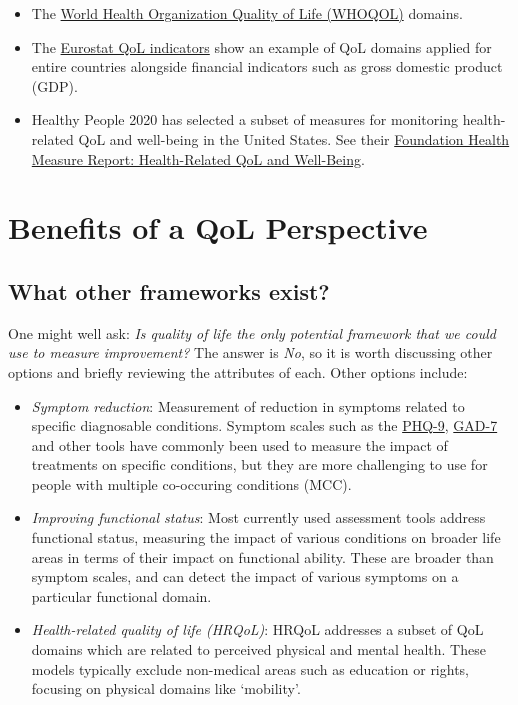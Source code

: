 \documentclass[
]{book}
\providecommand{\tightlist}{%
  \setlength{\itemsep}{0pt}\setlength{\parskip}{0pt}}
\begin{document}
\begin{itemize}
\tightlist
\item
  The \href{https://apps.who.int/iris/bitstream/handle/10665/77932/WHO_HIS_HSI_Rev.2012.03_eng.pdf?sequence=1\&isAllowed=y}{World Health Organization Quality of Life (WHOQOL)} domains.
\item
  The \href{https://ec.europa.eu/eurostat/statistics-explained/index.php?title=Quality_of_life_indicators}{Eurostat QoL indicators} show an example of QoL domains applied for entire countries alongside financial indicators such as gross domestic product (GDP).
\item
  Healthy People 2020 has selected a subset of measures for monitoring health-related QoL and well-being in the United States. See their \href{https://www.healthypeople.gov/sites/default/files/HRQoLWBFullReport.pdf}{Foundation Health Measure Report: Health-Related QoL and Well-Being}.
\end{itemize}

\hypertarget{benefits-of-a-qol-perspective}{%
\section{Benefits of a QoL Perspective}\label{benefits-of-a-qol-perspective}}

\hypertarget{what-other-frameworks-exist}{%
\subsection{What other frameworks exist?}\label{what-other-frameworks-exist}}

One might well ask: \emph{Is quality of life the only potential framework that we could use to measure improvement?} The answer is \emph{No}, so it is worth discussing other options and briefly reviewing the attributes of each. Other options include:

\begin{itemize}
\tightlist
\item
  \emph{Symptom reduction}: Measurement of reduction in symptoms related to specific diagnosable conditions. Symptom scales such as the \href{https://www.phqscreeners.com/sites/g/files/g10049256/f/201412/PHQ-9_English.pdf}{PHQ-9}, \href{}{GAD-7} and other tools have commonly been used to measure the impact of treatments on specific conditions, but they are more challenging to use for people with multiple co-occuring conditions (MCC).
\item
  \emph{Improving functional status}: Most currently used assessment tools address functional status, measuring the impact of various conditions on broader life areas in terms of their impact on functional ability. These are broader than symptom scales, and can detect the impact of various symptoms on a particular functional domain.
\item
  \emph{Health-related quality of life (HRQoL)}: HRQoL addresses a subset of QoL domains which are related to perceived physical and mental health. These models typically exclude non-medical areas such as education or rights, focusing on physical domains like `mobility'.
\end{itemize}
\end{document}
